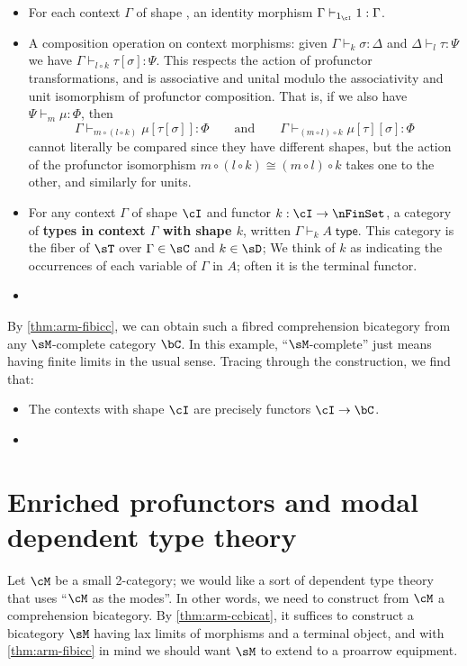 \documentclass{amsart}
\let\types\vdash
\def\type{\;\mathsf{type}}
\begin{document}
\begin{itemize}
\item For each context $\Gamma$ of shape \cI, an identity morphism $\Gamma \types_{1_\cI} 1 : \Gamma$.
\item A composition operation on context morphisms: given $\Gamma\types_k \sigma:\Delta$ and $\Delta\types_l \tau:\Psi$ we have $\Gamma\types_{l\circ k} \tau[\sigma] : \Psi$.
  This respects the action of profunctor transformations, and is associative and unital modulo the associativity and unit isomorphism of profunctor composition.
  That is, if we also have $\Psi \types_m \mu :\Phi$, then
  \[\Gamma\types_{m\circ (l\circ k)} \mu[\tau[\sigma]] : \Phi
  \qquad\text{and}\qquad
  \Gamma\types_{(m\circ l)\circ k} \mu[\tau][\sigma] : \Phi
  \]
  cannot literally be compared since they have different shapes, but the action of the profunctor isomorphism $m\circ (l\circ k) \cong (m\circ l) \circ k$ takes one to the other, and similarly for units.
\item For any context $\Gamma$ of shape $\cI$ and functor $k:\cI\to\nFinSet$, a category of \textbf{types in context $\Gamma$ with shape $k$}, written $\Gamma\types_k A\type$.
  This category is the fiber of $\sT$ over $\Gamma\in\sC$ and $k\in \sD$; 
  We think of $k$ as indicating the occurrences of each variable of $\Gamma$ in $A$; often it is the terminal functor.
\item {}
\end{itemize}

By \cref{thm:arm-fibicc}, we can obtain such a fibred comprehension bicategory from any $\sM$-complete category $\bC$.
In this example, ``$\sM$-complete'' just means having finite limits in the usual sense.
Tracing through the construction, we find that:

\begin{itemize}
\item The contexts with shape $\cI$ are precisely functors $\cI\to\bC$.
\item {}
\end{itemize}


\section{Enriched profunctors and modal dependent type theory}
\label{sec:prof-modal}

Let $\cM$ be a small 2-category; we would like a sort of dependent type theory that uses ``$\cM$ as the modes''.
In other words, we need to construct from $\cM$ a comprehension bicategory.
By \cref{thm:arm-ccbicat}, it suffices to construct a bicategory $\sM$ having lax limits of morphisms and a terminal object, and with \cref{thm:arm-fibicc} in mind we should want $\sM$ to extend to a proarrow equipment.
\end{document}
